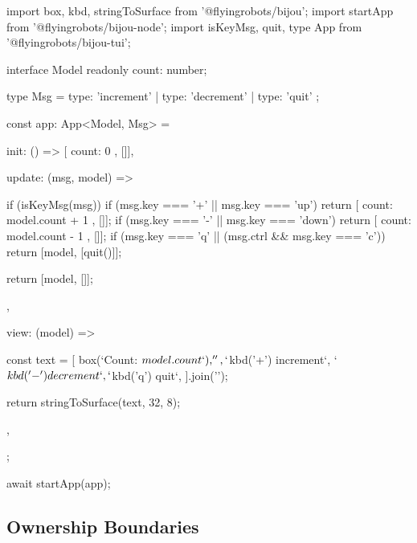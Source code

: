 \begin{CodeBlock}
import { box, kbd, stringToSurface } from '@flyingrobots/bijou';
import { startApp } from '@flyingrobots/bijou-node';
import { isKeyMsg, quit, type App } from '@flyingrobots/bijou-tui';

interface Model {
  readonly count: number;
}

type Msg = { type: 'increment' } | { type: 'decrement' } | { type: 'quit' };

const app: App<Model, Msg> = {
  init: () => [{ count: 0 }, []],

  update: (msg, model) => {
    if (isKeyMsg(msg)) {
      if (msg.key === '+' || msg.key === 'up') {
        return [{ count: model.count + 1 }, []];
      }
      if (msg.key === '-' || msg.key === 'down') {
        return [{ count: model.count - 1 }, []];
      }
      if (msg.key === 'q' || (msg.ctrl && msg.key === 'c')) {
        return [model, [quit()]];
      }
    }

    return [model, []];
  },

  view: (model) => {
    const text = [
      box(`Count: ${model.count}`),
      '',
      `${kbd('+')} increment`,
      `${kbd('-')} decrement`,
      `${kbd('q')} quit`,
    ].join('\n');

    return stringToSurface(text, 32, 8);
  },
};

await startApp(app);
\end{CodeBlock}

\subsection{Ownership Boundaries}\label{record-015-ownership-boundaries}

\begin{center}
\end{center}

